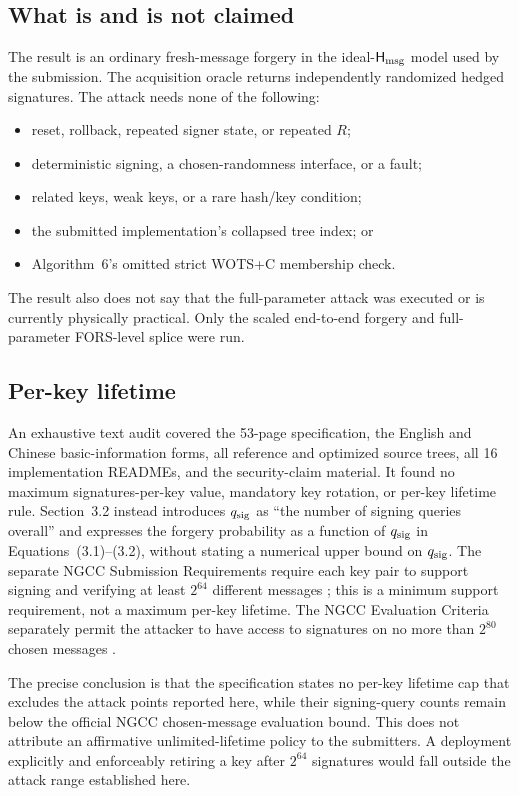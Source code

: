 \documentclass[11pt,a4paper]{article}
\newcommand{\Hmsg}{\ensuremath{\mathsf{H}_{\rm msg}}}
\begin{document}
\subsection{What is and is not claimed}

The result is an ordinary fresh-message forgery in the ideal-$\Hmsg$ model
used by the submission.  The acquisition oracle returns independently
randomized hedged signatures.  The attack needs none of the following:
\begin{itemize}[leftmargin=*,itemsep=1pt]
  \item reset, rollback, repeated signer state, or repeated $R$;
  \item deterministic signing, a chosen-randomness interface, or a fault;
  \item related keys, weak keys, or a rare hash/key condition;
  \item the submitted implementation's collapsed tree index; or
  \item Algorithm~6's omitted strict WOTS+C membership check.
\end{itemize}
The result also does not say that the full-parameter attack was executed or is
currently physically practical.  Only the scaled end-to-end forgery and
full-parameter FORS-level splice were run.

\subsection{Per-key lifetime}

An exhaustive text audit covered the 53-page specification, the English and
Chinese basic-information forms, all reference and optimized source trees,
all 16 implementation READMEs, and the security-claim material.  It found no
maximum signatures-per-key value, mandatory key rotation, or per-key lifetime
rule.  Section~3.2 instead introduces $q_{\rm sig}$ as ``the number of signing
queries overall'' and expresses the forgery probability as a function of
$q_{\rm sig}$ in Equations~(3.1)--(3.2), without stating a numerical upper
bound on $q_{\rm sig}$.
The separate NGCC Submission Requirements require each key pair to support
signing and verifying at least $2^{64}$ different messages
\cite{ngcc-requirements}; this is a minimum support requirement, not a maximum
per-key lifetime.  The NGCC Evaluation Criteria separately permit the attacker
to have access to signatures on no more than $2^{80}$ chosen messages
\cite{ngcc-criteria}.

The precise conclusion is that the specification states no per-key lifetime
cap that excludes the attack points reported here, while their signing-query
counts remain below the official NGCC chosen-message evaluation bound.  This
does not attribute an affirmative unlimited-lifetime policy to the submitters.
A deployment explicitly and enforceably retiring a key after $2^{64}$
signatures would fall outside the attack range established here.
\end{document}
